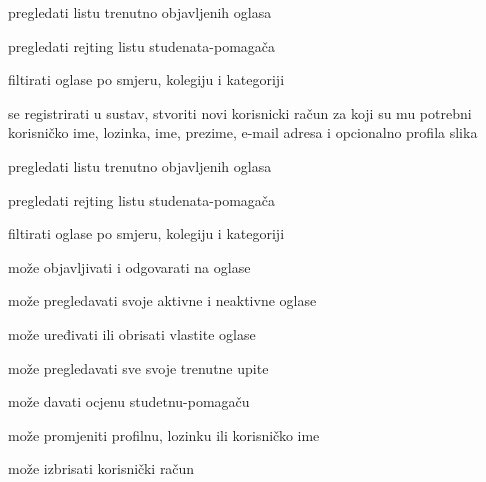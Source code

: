 			
			\begin{packed_enum}
				\item  {}
				
				\begin{packed_enum}
					
					\item pregledati listu trenutno objavljenih oglasa
					\item pregledati rejting listu studenata-pomagača
					\item filtirati oglase po smjeru, kolegiju i kategoriji
					\item se registrirati u sustav, stvoriti novi korisnicki račun za koji su mu potrebni korisničko ime, lozinka, ime, prezime, e-mail adresa i opcionalno profila slika
					
				\end{packed_enum}
			
				\item  {}
				
				\begin{packed_enum}
					
					\item pregledati listu trenutno objavljenih oglasa
					\item pregledati rejting listu studenata-pomagača
					\item filtirati oglase po smjeru, kolegiju i kategoriji
					\item može objavljivati i odgovarati na oglase
					\item može pregledavati svoje aktivne i neaktivne oglase
					\item može uređivati ili obrisati vlastite oglase
					\item može pregledavati sve svoje trenutne upite
					\item može davati ocjenu studetnu-pomagaču
					\item može promjeniti profilnu, lozinku ili korisničko ime
					\item može izbrisati korisnički račun
					
				\end{packed_enum}
				
				\item  {}
				
				\begin{packed_enum}
					

\end{packed_enum}
\end{packed_enum}
